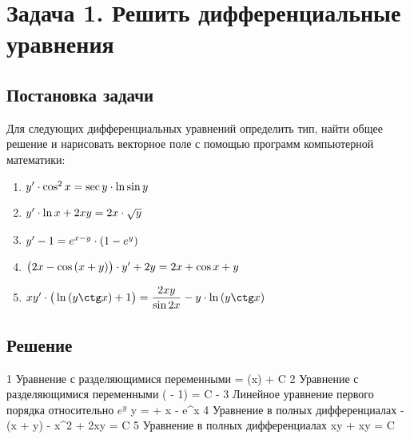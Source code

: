 

\section{Задача 1. Решить дифференциальные уравнения}
\subsection{Постановка задачи}
Для следующих дифференциальных уравнений определить тип, найти общее
решение и нарисовать векторное поле с помощью программ компьютерной математики:

\begin{enumerate}[label={}]                                                 
	\item $ {y}' \cdot \cos^{2}{x} = \sec{y} \cdot \ln{\sin{y}} $          
	\item $ {y}' \cdot \ln{x} + 2xy = 2x \cdot \sqrt{y} $
	\item $ {y}' - 1 = e^{x-y} \cdot (1 - e^{y}) $                             
	\item $ \big(2x - \cos{(x + y)} \big) \cdot {y}' + 2y = 2{x} + \cos{x + y} $
	\item $ \equationFifth $
\end{enumerate}

\newpage

\subsection{Решение}
\begin{enumerate}
	\taskOneSolutionItem
		{1}
		{\equationFirst}
		{Уравнение с разделяющимися переменными}
		{ = \tan(x) + {C}}
	\taskOneSolutionItem
		{2}
		{\equationSecond}
		{Уравнение с разделяющимися переменными}
		{\ln( - 1) = C - }
	\taskOneSolutionItem
		{3}
		{\equationThird}
		{Линейное уравнение первого порядка относительно $ e^y $}
		{y =  + {x} - e^{x}}
	\taskOneSolutionItem
		{4}
		{\equationFourth}
		{Уравнение в полных дифференциалах}
		{-\sin(x + y) - {x}^2 + 2xy = C}
	\taskOneSolutionItem
		{5}
		{\equationFifth}
		{Уравнение в полных дифференциалах}
		{xy + xy = C}
\end{enumerate}

